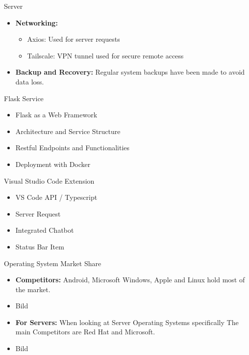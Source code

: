 \documentclass{beamer}
\begin{document}
\begin{frame}{Server}
  \begin{itemize}
    \item \textbf{Networking:}
      \begin{itemize}
        \item Axios: Used for server requests 
        \item Tailscale: VPN tunnel used for secure remote access 
      \end{itemize}
    \item \textbf{Backup and Recovery:} Regular system backups have been made to avoid data loss.      
  \end{itemize}
\end{frame}

\begin{frame}{Flask Service}
  \begin{itemize}
    \item Flask as a Web Framework
    \item Architecture and Service Structure
    \item Restful Endpoints and Functionalities
    \item Deployment with Docker
  \end{itemize}
\end{frame}


\begin{frame}{Visual Studio Code Extension}
  \begin{itemize}
    \item VS Code API / Typescript
    \item Server Request
    \item Integrated Chatbot
    \item Status Bar Item 
  \end{itemize}
\end{frame}

\begin{frame}{Operating System Market Share} 
  \begin{itemize}
    \item \textbf{Competitors:} Android, Microsoft Windows, Apple and Linux hold most of the market.
    \item  Bild
    \item \textbf{For Servers:} When looking at Server Operating Systems specifically The main Competitors are Red Hat and Microsoft.
    \item  Bild
  \end{itemize}
\end{frame}
\end{document}

